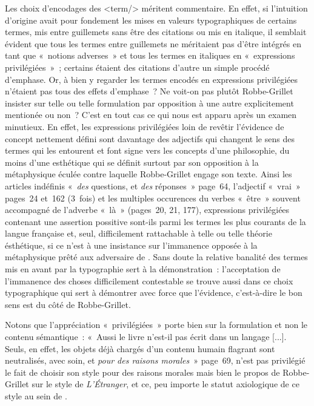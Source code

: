 \documentclass[12pt, a4paper]{article}
\begin{document}
Les choix d'encodages des <term/> méritent commentaire. En effet, si l'intuition d'origine avait pour fondement les mises en valeurs typographiques de certains termes, mis entre guillemets sans être des citations ou mis en italique, il semblait évident que tous les termes entre guillemets ne méritaient pas d'être intégrés en tant que «~notions adverses~» et tous les termes en italiques en «~expressions privilégiées~»~; certains étaient des citations d'autre un simple procédé d'emphase. Or, à bien y regarder les termes encodés en expressions privilégiées n'étaient pas tous des effets d'emphase~? Ne voit-on pas plutôt Robbe-Grillet insister sur telle ou telle formulation par opposition à une autre explicitement mentionée ou non~? C'est en tout cas ce qui nous est apparu après un examen minutieux. En effet, les expressions privilégiées loin de revêtir l'évidence de concept nettement défini sont davantage des adjectifs qui changent le sens des termes qui les entourent et font signe vers les concepts d'une philosophie, du moins d'une esthétique qui se définit surtout par son opposition à la métaphysique éculée contre laquelle Robbe-Grillet engage son texte. Ainsi les articles indéfinis «~\textit{des} questions, et \textit{des} réponses~» page~64, l'adjectif «~vrai~» pages~24 et~162 (3~fois) et les multiples occurences du verbes «~être~» souvent accompagné de l'adverbe «~là~» (pages~20, 21, 177), expressions privilégiées contenant une assertion possitive sont-ils parmi les termes les plus courants de la langue française et, seul, difficilement rattachable à telle ou telle théorie ésthétique, si ce n'est à une insistance sur l'immanence opposée à la métaphysique prêté aux adversaire de \robbe{}. Sans doute la relative banalité des termes mis en avant par la typographie sert à la démonstration~: l'acceptation de l'immanence des choses difficilement contestable se trouve aussi dans ce choix typographique qui sert à démontrer avec force que l'évidence, c'est-à-dire le bon sens est du côté de Robbe-Grillet.



Notons que l'appréciation «~privilégiées~» porte bien sur la formulation et non le contenu sémantique~: «~Aussi le livre n’est-il pas écrit dans un langage [...]. Seuls, en effet, les objets déjà chargés d’un contenu humain flagrant sont neutralisés, avec soin, et \textit{pour des raisons morales}~» page~69, n'est pas privilégié le fait de choisir son style pour des raisons morales mais bien le propos de Robbe-Grillet sur le style de \textit{L'Étranger}, et ce, peu importe le statut axiologique de ce style au sein de \punr{}.
\end{document}
